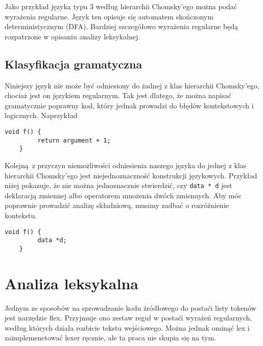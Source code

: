 \documentclass[a4paper, 12pt]{extarticle}
\newcommand{\spacing}{\vskip 0.5cm}
\begin{document}
			\spacing

			Jako przykład języka typu 3 według hierarchii Chomsky'ego można podać wyrażenia regularne. Język ten
			opisuje się automatem skończonym deterministycznym (DFA). Bardziej szczegółowo wyrażenia regularne będą
			rozpatrzone w opisaniu analizy leksykalnej.
			
		\subsection{Klasyfikacja gramatyczna}

			Niniejszy język nie może być odniesiony do żadnej z klas hierarchii Chomsky'ego, chociaż jest on
			językiem regularnym. Tak jest dlatego, że można napisać gramatycznie poprawny kod, który jednak prowadzi
			do błędów kontekstowych i logicznych. Naprzykład 
			
			\spacing
			
			\begin{lstlisting}[caption={}, label={lst:ambigous-production}]
	void f() {
		 return argument + 1;
	}
			\end{lstlisting}

			\spacing
			
			Kolejną z przyczyn niemożliwości odniesienia naszego języka do jednej z klas hierarchii Chomsky'ego
			jest niejednoznaczność konstrukcji językowych. Przykład niżej pokazuje, że nie można jednoznacznie
			stwierdzić, czy \texttt{data * d} jest deklaracją zmiennej albo operatorem mnożenia dwóch zmiennych.
			Aby móc poprawnie prowadzić analizę składniową, musimy zadbać o rozróżnienie kontekstu.

			\spacing
			
			\begin{lstlisting}[caption={}, label={lst:ambigous-production}]
	void f() {
		 data *d;
	}
			\end{lstlisting}

			\newpage

	\section{Analiza leksykalna}

		Jednym ze sposobów na sprowadzanie kodu źródłowego do postaći listy tokenów jest narzędzie flex.
		Przyjmuje ono zestaw reguł w postaći wyrażeń regularnych, według których
		działa rozbicie tekstu wejściowego. Można jednak ominąć lex i zaimplemenetować lexer ręcznie, ale
		ta praca nie skupia się na tym.
\end{document}
